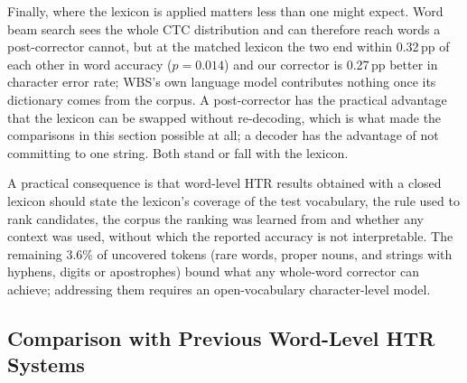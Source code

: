 \documentclass{ws-ijprai}
\begin{document}
Finally, where the lexicon is applied matters less than one might expect.
Word beam search sees the whole CTC distribution and can therefore reach
words a post-corrector cannot, but at the matched lexicon the two end within
0.32\,pp of each other in word accuracy
($p=0.014$)
and our corrector is 0.27\,pp better in
character error rate; WBS's own language model contributes nothing once its
dictionary comes from the corpus. A post-corrector has the practical
advantage that the lexicon can be swapped without re-decoding, which is what
made the comparisons in this section possible at all; a decoder has the
advantage of not committing to one string. Both stand or fall with the
lexicon.

A practical consequence is that word-level HTR results obtained with a
closed lexicon should state the lexicon's coverage of the test
vocabulary, the rule used to rank candidates, the corpus the ranking
was learned from and whether any context was used, without which the
reported accuracy is not interpretable. The remaining 3.6\% of uncovered
tokens (rare words, proper nouns, and strings with hyphens, digits or
apostrophes) bound what any whole-word corrector can achieve; addressing them
requires an open-vocabulary character-level model.

\subsection{Comparison with Previous Word-Level HTR Systems}
\label{sec:disc-sueiras}
\end{document}
